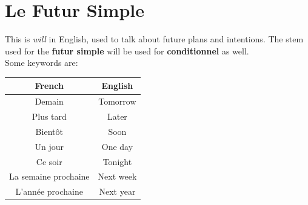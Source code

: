 \documentclass{book}
\begin{document}
\section{Le Futur Simple}
This is \textit{will} in English, used to talk about future plans and intentions. The stem used for the \textbf{futur simple} will be used for \textbf{conditionnel} as well. \\
Some keywords are:
\begin{center}
    \begin{tabular}{|c|c|}
        \hline
        \textbf{French} & \textbf{English} \\
        \hline
        Demain & Tomorrow \\
        \hline
        Plus tard & Later \\
        \hline
        Bientôt & Soon \\
        \hline
        Un jour & One day \\
        \hline
        Ce soir & Tonight \\
        \hline
        La semaine prochaine & Next week \\
        \hline
        L'année prochaine & Next year \\
        \hline
    \end{tabular}
\end{center}
\end{document}
